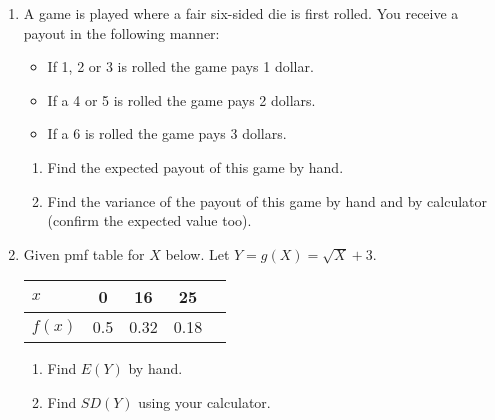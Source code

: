 \documentclass{article}
\begin{document}
\begin{enumerate}
    \item A game is played where a fair six-sided die is first rolled. You receive a payout in the following manner:%
    \begin{itemize}
        \item If 1, 2 or 3 is rolled the game pays 1 dollar.
        \item If a 4 or 5 is rolled the game pays 2 dollars.
        \item If a 6 is rolled the game pays 3 dollars.
    \end{itemize}
    \begin{enumerate}
        \item Find the expected payout of this game by hand.\vspace{80pt}
        \item Find the variance of the payout of this game by hand and by calculator (confirm the expected value too).\vspace{80pt}
    \end{enumerate}
    
    \item Given pmf table for $X$ below. Let $Y = g(X) = \sqrt{X} + 3$.\bigskip\\%
    \begin{tabular}{| l || c | c | c | c |}
        \hline
        $x$ & 0 & 16 & 25\\
        \hline
        $f(x)$ & 0.5 & 0.32 & 0.18\\
        \hline
    \end{tabular}\bigskip
    \begin{enumerate}
        \item Find $E(Y)$ by hand.\vspace{100pt}
        \item Find $SD(Y)$ using your calculator.\vspace{80pt}
    \end{enumerate}
        

\end{enumerate}
\end{document}

